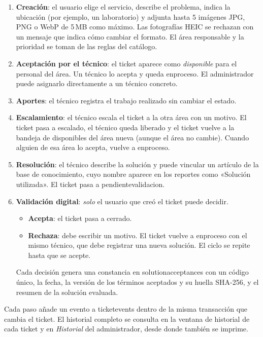 \documentclass[11pt,a4paper,oneside]{report}
\newcommand{\codus}{\textunderscore\allowbreak}
\DeclareRobustCommand{\cod}[1]{{\small\ttfamily\let\_\codus #1}}
\begin{document}
\begin{enumerate}
  \item \textbf{Creación}: el usuario elige el servicio, describe el problema, indica la ubicación
        (por ejemplo, un laboratorio) y adjunta hasta 5 imágenes JPG, PNG o WebP de 5\,MB como máximo.
        Las fotografías HEIC se rechazan con un mensaje que indica cómo cambiar el formato.
        El área responsable y la prioridad se toman de las reglas del catálogo.
  \item \textbf{Aceptación por el técnico}: el ticket aparece como \emph{disponible} para el personal del área.
        Un técnico lo acepta y queda \cod{en\_proceso}. El administrador puede asignarlo directamente
        a un técnico concreto.
  \item \textbf{Aportes}: el técnico registra el trabajo realizado sin cambiar el estado.
  \item \textbf{Escalamiento}: el técnico escala el ticket a la otra área con un motivo. El ticket pasa
        a \cod{escalado}, el técnico queda liberado y el ticket vuelve a la bandeja de disponibles del área
        nueva (aunque el área no cambie). Cuando alguien de esa área lo acepta, vuelve a \cod{en\_proceso}.
  \item \textbf{Resolución}: el técnico describe la solución y puede vincular un artículo de la
        base de conocimiento, cuyo nombre aparece en los reportes como «Solución utilizada».
        El ticket pasa a \cod{pendiente\_validacion}.
  \item \textbf{Validación digital}: \emph{solo} el usuario que creó el ticket puede decidir.
        \begin{itemize}
          \item \textbf{Acepta}: el ticket pasa a \cod{cerrado}.
          \item \textbf{Rechaza}: debe escribir un motivo. El ticket vuelve a \cod{en\_proceso} con el mismo técnico, que debe registrar una nueva solución. El ciclo se repite hasta que se acepte.
        \end{itemize}
        Cada decisión genera una constancia en \cod{solution\_acceptances} con un código único, la fecha,
        la versión de los términos aceptados y su huella SHA-256, y el resumen de la solución
        evaluada.
\end{enumerate}

Cada paso añade un evento a \cod{ticket\_events} dentro de la misma transacción que cambia el ticket.
El historial completo se consulta en la ventana de historial de cada ticket y en \emph{Historial}
del administrador, desde donde también se imprime.
\end{document}
